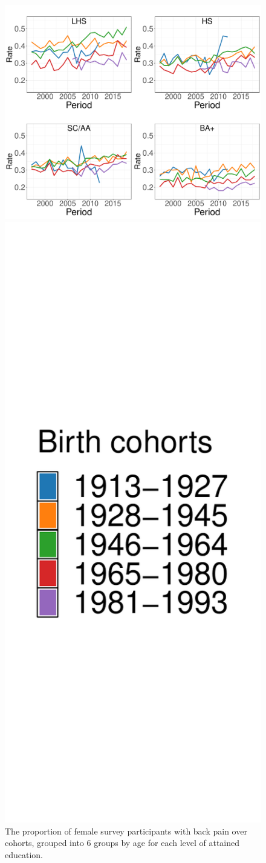 \begin{figure}[!ht]
    \centering
    \begin{minipage}{.5\textwidth}
      \centering
      \includegraphics[width=1.6\linewidth]{Figures/rateplot_cohort_f.pdf}
    \end{minipage}%
    \begin{minipage}{.5\textwidth}
      \hfill
      \includegraphics[width=0.4\linewidth]{Figures/rateplot_cohort_legend_f.pdf}
    \end{minipage}
    \caption{The proportion of female survey participants with back pain over cohorts, grouped into $6$ groups by age for each level of attained education.}
    \label{figure:explorative:rateplot_cohort_f}
\end{figure}

